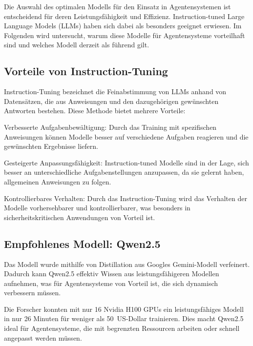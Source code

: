 Die Auswahl des optimalen Modells für den Einsatz in Agentensystemen ist entscheidend für deren Leistungsfähigkeit und Effizienz. Instruction-tuned Large Language Models (LLMs) haben sich dabei als besonders geeignet erwiesen. Im Folgenden wird untersucht, warum diese Modelle für Agentensysteme vorteilhaft sind und welches Modell derzeit als führend gilt.

\subsection{Vorteile von Instruction-Tuning}

Instruction-Tuning bezeichnet die Feinabstimmung von LLMs anhand von Datensätzen, die aus Anweisungen und den dazugehörigen gewünschten Antworten bestehen. Diese Methode bietet mehrere Vorteile:

    Verbesserte Aufgabenbewältigung: Durch das Training mit spezifischen Anweisungen können Modelle besser auf verschiedene Aufgaben reagieren und die gewünschten Ergebnisse liefern. \cite{ibm_instruction_tuning}

    Gesteigerte Anpassungsfähigkeit: Instruction-tuned Modelle sind in der Lage, sich besser an unterschiedliche Aufgabenstellungen anzupassen, da sie gelernt haben, allgemeinen Anweisungen zu folgen.\cite{xarchives_instruction_tuning}

    Kontrollierbares Verhalten: Durch das Instruction-Tuning wird das Verhalten der Modelle vorhersehbarer und kontrollierbarer, was besonders in sicherheitskritischen Anwendungen von Vorteil ist. \cite{xarchives_instruction_tuning}

\subsection{Empfohlenes Modell: Qwen2.5}
 \cite{roth_researchers_2025}
 
 Das Modell wurde mithilfe von Distillation aus Googles Gemini-Modell verfeinert. Dadurch kann Qwen2.5 effektiv Wissen aus leistungsfähigeren Modellen aufnehmen, was für Agentensysteme von Vorteil ist, die sich dynamisch verbessern müssen.
 
 Die Forscher konnten mit nur 16 Nvidia H100 GPUs ein leistungsfähiges Modell in nur 26 Minuten für weniger als 50~US-Dollar trainieren. Dies macht Qwen2.5 ideal für Agentensysteme, die mit begrenzten Ressourcen arbeiten oder schnell angepasst werden müssen.
 
